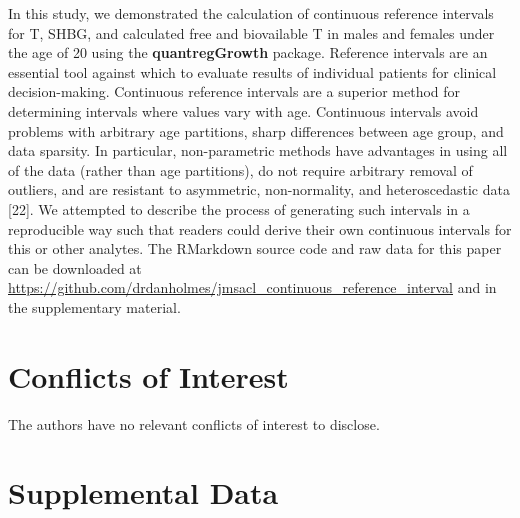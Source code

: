 \documentclass[]{elsarticle} %
\begin{document}
In this study, we demonstrated the calculation of continuous reference
intervals for T, SHBG, and calculated free and biovailable T in males
and females under the age of 20 using the \textbf{quantregGrowth}
package. Reference intervals are an essential tool against which to
evaluate results of individual patients for clinical decision-making.
Continuous reference intervals are a superior method for determining
intervals where values vary with age. Continuous intervals avoid
problems with arbitrary age partitions, sharp differences between age
group, and data sparsity. In particular, non-parametric methods have
advantages in using all of the data (rather than age partitions), do not
require arbitrary removal of outliers, and are resistant to asymmetric,
non-normality, and heteroscedastic data {[}22{]}. We attempted to
describe the process of generating such intervals in a reproducible way
such that readers could derive their own continuous intervals for this
or other analytes. The RMarkdown source code and raw data for this paper
can be downloaded at
\url{https://github.com/drdanholmes/jmsacl_continuous_reference_interval}
and in the supplementary material.

\hypertarget{conflicts-of-interest}{%
\section{Conflicts of Interest}\label{conflicts-of-interest}}

The authors have no relevant conflicts of interest to disclose.

\hypertarget{supplemental-data}{%
\section{Supplemental Data}\label{supplemental-data}}
\end{document}
